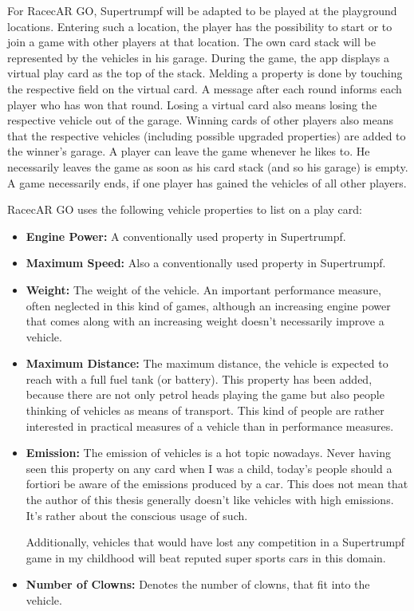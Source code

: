 For RacecAR GO, Supertrumpf will be adapted to be played at the playground locations. Entering such a location, the player has the possibility to start or to join a game with other players at that location. The own card stack will be represented by the vehicles in his garage. During the game, the app displays a virtual play card as the top of the stack. Melding a property is done by touching the respective field on the virtual card. A message after each round informs each player who has won that round. Losing a virtual card also means losing the respective vehicle out of the garage. Winning cards of other players also means that the respective vehicles (including possible upgraded properties) are added to the winner's garage. A player can leave the game whenever he likes to. He necessarily leaves the game as soon as his card stack (and so his garage) is empty. A game necessarily ends, if one player has gained the vehicles of all other players.

RacecAR GO uses the following vehicle properties to list on a play card:
\begin{itemize}
  \item\textbf{Engine Power:} A conventionally used property in Supertrumpf.
  \item\textbf{Maximum Speed:} Also a conventionally used property in Supertrumpf.
  \item\textbf{Weight:} The weight of the vehicle. An important performance measure, often neglected in this kind of games, although an increasing engine power that comes along with an increasing weight doesn't necessarily improve a vehicle.
  \item\textbf{Maximum Distance:} The maximum distance, the vehicle is expected to reach with a full fuel tank (or battery). This property has been added, because there are not only petrol heads playing the game but also people thinking of vehicles as means of transport. This kind of people are rather interested in practical measures of a vehicle than in performance measures.
  \item\textbf{Emission:} The emission of vehicles is a hot topic nowadays. Never having seen this property on any card when I was a child, today's people should a fortiori be aware of the emissions produced by a car. This does not mean that the author of this thesis generally doesn't like vehicles with high emissions. It's rather about the conscious usage of such.

Additionally, vehicles that would have lost any competition in a Supertrumpf game in my childhood will beat reputed super sports cars in this domain.
  \item\textbf{Number of Clowns:} Denotes the number of clowns, that fit into the vehicle.
\end{itemize}

